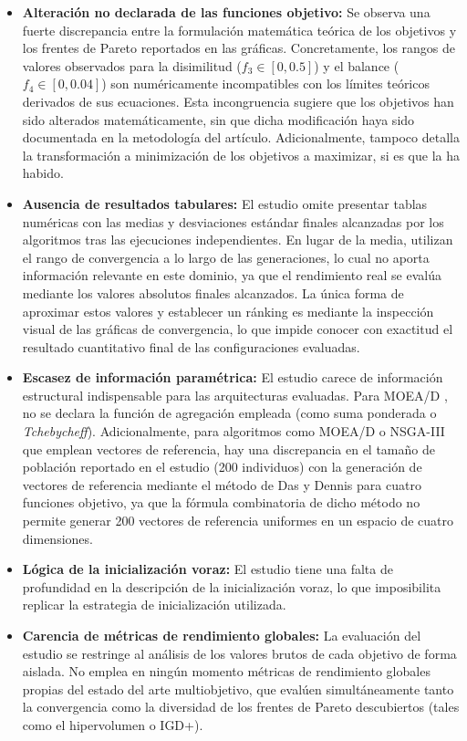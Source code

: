 \begin{itemize}
    \item \textbf{Alteración no declarada de las funciones objetivo:} Se observa una fuerte discrepancia entre la formulación matemática teórica de los objetivos y los frentes de Pareto reportados en las gráficas. Concretamente, los rangos de valores observados para la disimilitud ($f_3 \in [0, 0.5]$) y el balance ($f_4 \in [0, 0.04]$) son numéricamente incompatibles con los límites teóricos derivados de sus ecuaciones. Esta incongruencia sugiere que los objetivos han sido alterados matemáticamente, sin que dicha modificación haya sido documentada en la metodología del artículo. Adicionalmente, tampoco detalla la transformación a minimización de los objetivos a maximizar, si es que la ha habido.
    \item \textbf{Ausencia de resultados tabulares:} El estudio omite presentar tablas numéricas con las medias y desviaciones estándar finales alcanzadas por los algoritmos tras las ejecuciones independientes. En lugar de la media, utilizan el rango de convergencia a lo largo de las generaciones, lo cual no aporta información relevante en este dominio, ya que el rendimiento real se evalúa mediante los valores absolutos finales alcanzados. La única forma de aproximar estos valores y establecer un ránking es mediante la inspección visual de las gráficas de convergencia, lo que impide conocer con exactitud el resultado cuantitativo final de las configuraciones evaluadas.
    \item \textbf{Escasez de información paramétrica:} El estudio carece de información estructural indispensable para las arquitecturas evaluadas. Para MOEA/D \cite{zhang2007moea}, no se declara la función de agregación empleada (como suma ponderada o \textit{Tchebycheff}). Adicionalmente, para algoritmos como MOEA/D o NSGA-III \cite{deb2013evolutionary} que emplean vectores de referencia, hay una discrepancia en el tamaño de población reportado en el estudio (200 individuos) con la generación de vectores de referencia mediante el método de Das y Dennis \cite{das1998normal} para cuatro funciones objetivo, ya que la fórmula combinatoria de dicho método no permite generar 200 vectores de referencia uniformes en un espacio de cuatro dimensiones.
    \item \textbf{Lógica de la inicialización voraz:} El estudio tiene una falta de profundidad en la descripción de la inicialización voraz, lo que imposibilita replicar la estrategia de inicialización utilizada.
    \item \textbf{Carencia de métricas de rendimiento globales:} La evaluación del estudio se restringe al análisis de los valores brutos de cada objetivo de forma aislada. No emplea en ningún momento métricas de rendimiento globales propias del estado del arte multiobjetivo, que evalúen simultáneamente tanto la convergencia como la diversidad de los frentes de Pareto descubiertos (tales como el hipervolumen o IGD+).

\end{itemize}
